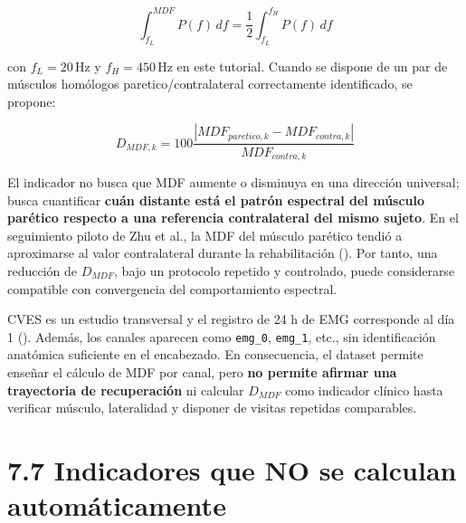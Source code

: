 \documentclass[
  spanish,
  a4paper,
  DIV=11,
  numbers=noendperiod]{scrreprt}
\begin{document}
\[
\int_{f_L}^{MDF}P(f)\,df
=
\frac{1}{2}\int_{f_L}^{f_H}P(f)\,df
\]

con \(f_L=20\,\mathrm{Hz}\) y \(f_H=450\,\mathrm{Hz}\) en este tutorial.
Cuando se dispone de un par de músculos homólogos paretico/contralateral
correctamente identificado, se propone:

\[
D_{MDF,k}=100\frac{|MDF_{paretico,k}-MDF_{contra,k}|}{MDF_{contra,k}}
\]

El indicador no busca que MDF aumente o disminuya en una dirección
universal; busca cuantificar \textbf{cuán distante está el patrón
espectral del músculo parético respecto a una referencia contralateral
del mismo sujeto}. En el seguimiento piloto de Zhu et al., la MDF del
músculo parético tendió a aproximarse al valor contralateral durante la
rehabilitación (). Por tanto, una
reducción de \(D_{MDF}\), bajo un protocolo repetido y controlado, puede
considerarse compatible con convergencia del comportamiento espectral.

\begin{tcolorbox}[enhanced jigsaw, arc=.35mm, bottomrule=.15mm, bottomtitle=1mm, breakable, colback=white, colbacktitle=quarto-callout-warning-color!10!white, colframe=quarto-callout-warning-color-frame, coltitle=black, left=2mm, leftrule=.75mm, opacityback=0, opacitybacktitle=0.6, rightrule=.15mm, title=\textcolor{quarto-callout-warning-color}{\faExclamationTriangle}\hspace{0.5em}{Advertencia metodológica}, titlerule=0mm, toprule=.15mm, toptitle=1mm]

CVES es un estudio transversal y el registro de 24 h de EMG corresponde
al día 1 (). Además, los
canales aparecen como \texttt{emg\_0}, \texttt{emg\_1}, etc., sin
identificación anatómica suficiente en el encabezado. En consecuencia,
el dataset permite enseñar el cálculo de MDF por canal, pero
\textbf{no permite afirmar una trayectoria de recuperación} ni calcular
\(D_{MDF}\) como indicador clínico hasta verificar músculo, lateralidad
y disponer de visitas repetidas comparables.

\end{tcolorbox}

\section{7.7 Indicadores que NO se calculan
automáticamente}\label{indicadores-que-no-se-calculan-automuxe1ticamente}
\end{document}
